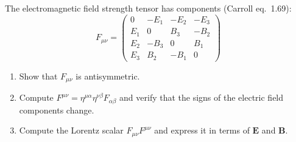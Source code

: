 \begin{exercise}
\label{ex:em_tensor}
The electromagnetic field strength tensor has components (Carroll eq.~1.69):
\[
    F_{\mu\nu} =
    \begin{pmatrix}
    0 & -E_1 & -E_2 & -E_3 \\
    E_1 & 0 & B_3 & -B_2 \\
    E_2 & -B_3 & 0 & B_1 \\
    E_3 & B_2 & -B_1 & 0
    \end{pmatrix}
\]
\begin{enumerate}[label=(\alph*)]
    \item Show that $F_{\mu\nu}$ is antisymmetric.
    \item Compute $F^{\mu\nu} = \eta^{\mu\alpha}\eta^{\nu\beta}F_{\alpha\beta}$
          and verify that the signs of the electric field components change.
    \item Compute the Lorentz scalar $F_{\mu\nu}F^{\mu\nu}$ and express it
          in terms of $\mathbf{E}$ and $\mathbf{B}$.
\end{enumerate}
\end{exercise}
